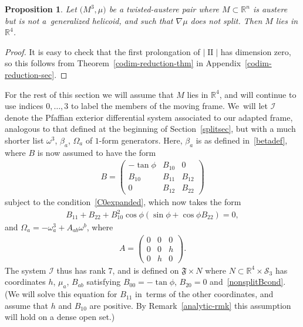 \documentclass[pdftex]{sigma}
\def\R{\mathbb{R}}
\def\II{\operatorname{II}} %
\def\calS{\mathcal{S}}
\def\F{\mathfrak{F}}
\def\calI{\mathcal{I}}
\def\w{\omega}
\newtheorem{Proposition}[Theorem]{Proposition}
\numberwithin{equation}{section}
\begin{document}
\begin{Proposition} \label{non-split-prelim}
Let $\big(M^3,\mu\big)$ be a twisted-austere pair where $M \subset \R^n$ is austere but is not a~generalized helicoid, and such that $\nabla \mu$ does not split. Then $M$ lies in $\R^4$.
\end{Proposition}
\begin{proof}
It is easy to check that the first prolongation of $|\II|$ has dimension zero, so this follows from Theorem~\ref{codim-reduction-thm} in Appendix~\ref{codim-reduction-sec}.
\end{proof}

For the rest of this section we will assume that $M$ lies in $\R^4$, and will continue to use indices $0, \dots, 3$ to label the members of the moving frame. We~will let $\calI$ denote the Pfaffian exterior differential system associated to our adapted frame, analogous to that defined at the beginning of Section~\ref{splitsec}, but with a much shorter list $\w^3$, $\beta_a$, $\Omega_a$ of $1$-form generators. Here, $\beta_a$ is as defined in~\eqref{betadef}, where $B$ is now assumed to have the form
\begin{gather*}
B=\begin{pmatrix} -\tan \phi & B_{10} & 0 \\ B_{10} & B_{11} & B_{12} \\ 0 & B_{12} & B_{22} \end{pmatrix}
\end{gather*}
subject to the condition~\eqref{C0expanded}, which now takes the form
\begin{gather} \label{nonsplitBcond}
B_{11}+B_{22} + B_{10}^2 \cos\phi (\sin\phi + \cos\phi B_{22})=0,
\end{gather}
and $\Omega_a = -\w^3_a + A_{ab} \w^b$, where
\begin{gather*}
A=\begin{pmatrix} 0 & 0 & 0 \\ 0 & 0 & h \\ 0 & h & 0 \end{pmatrix} .
\end{gather*}
The system $\calI$ thus has rank 7, and is defined on $\F \times N$ where $N \subset \R^4 \times \calS_3$ has coordinates $h$, $\mu_a$, $B_{ab}$ satisfying
$B_{00}=-\tan\phi$, $B_{20}=0$ and~\eqref{nonsplitBcond}. (We will solve this equation for $B_{11}$ in~terms of the other coordinates, and assume that $h$ and $B_{10}$ are positive. By Remark~\ref{analytic-rmk} this assumption will hold on a dense open set.)
\end{document}
